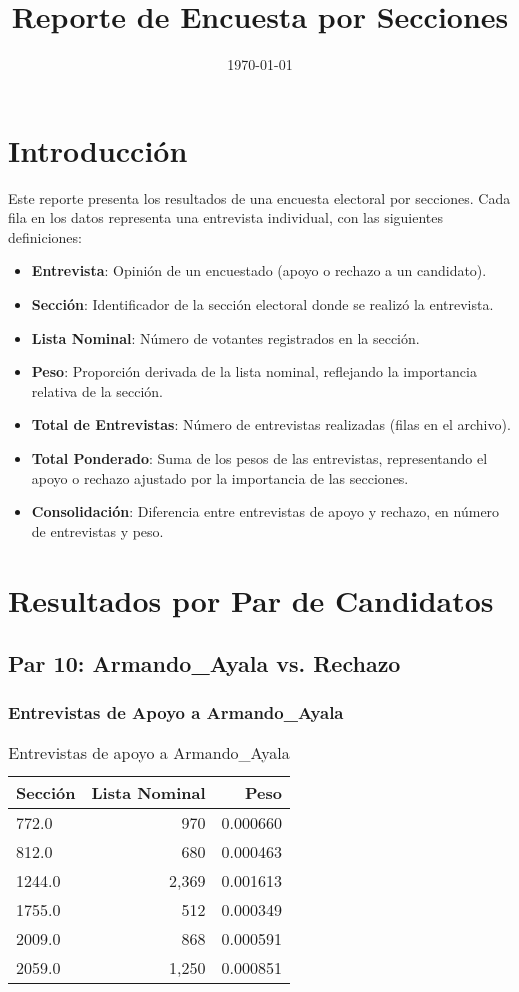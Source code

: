 \documentclass[a4paper,12pt]{article}
\begin{document}
\title{Reporte de Encuesta por Secciones}
\author{}
\date{\today}
\maketitle

\section*{Introducción}
Este reporte presenta los resultados de una encuesta electoral por secciones. Cada fila en los datos representa una entrevista individual, con las siguientes definiciones:
\begin{itemize}
    \item \textbf{Entrevista}: Opinión de un encuestado (apoyo o rechazo a un candidato).
    \item \textbf{Sección}: Identificador de la sección electoral donde se realizó la entrevista.
    \item \textbf{Lista Nominal}: Número de votantes registrados en la sección.
    \item \textbf{Peso}: Proporción derivada de la lista nominal, reflejando la importancia relativa de la sección.
    \item \textbf{Total de Entrevistas}: Número de entrevistas realizadas (filas en el archivo).
    \item \textbf{Total Ponderado}: Suma de los pesos de las entrevistas, representando el apoyo o rechazo ajustado por la importancia de las secciones.
    \item \textbf{Consolidación}: Diferencia entre entrevistas de apoyo y rechazo, en número de entrevistas y peso.
\end{itemize}

\section*{Resultados por Par de Candidatos}
\subsection*{Par 10: Armando_Ayala vs. Rechazo}

\subsubsection*{Entrevistas de Apoyo a Armando_Ayala}
\begin{table}[h]
\centering
\begin{tabular}{lrr}
\toprule
Sección & Lista Nominal & Peso \\ \midrule
772.0 & 970 & 0.000660 \\ 
812.0 & 680 & 0.000463 \\ 
1244.0 & 2,369 & 0.001613 \\ 
1755.0 & 512 & 0.000349 \\ 
2009.0 & 868 & 0.000591 \\ 
2059.0 & 1,250 & 0.000851 \\ 
\bottomrule
\end{tabular}
\caption{Entrevistas de apoyo a Armando_Ayala}
\end{table}
\end{document}
